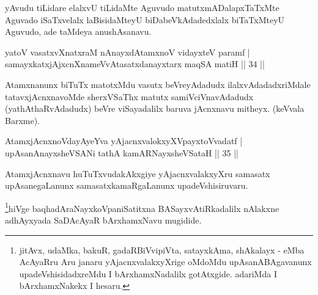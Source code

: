 \begin{artha}
yAvudu tiLidare elalxvU tiLidaMte Aguvudo matutx\break mADalapxTaTxMte Aguvado iSaTxvelalx laBisidaMteyU biDabeVkAdadedxlalx biTaTxMteyU Aguvudo, ade taMdeya anushAsanavu.
\end{artha}


\begin{shl}
yatoV vasatxvXnatxraM nAnayxdAtamxnoV vidayxteV paramf |\\
samayxkatxjAjxcnXnameVvAtasatxdanayxtarx maqSA matiH \hfill || 34 || 
\end{shl}

\begin{artha}
Atamxnanunx biTuTx matotxMdu vasutx beVreyAdadudx ilalxvAdadadx\-riMdale tatavxjAcnxnavoMde sherxVSaThx matutx samiVciVnavAdadudx (yathAthaRvAdadudx) beVre viSayadalilx baruva jAcnxnavu mitheyx. (keVvala Barxme).
\end{artha}


\begin{shl}
AtamxjAcnxnoVdayAyeYva yAjacnxvalokxyXV\s payxtoV\s vadatf |\\
upAsanAnayxsheVSANi tathA kamARNayxsheVSataH \hfill || 35 || 
\end{shl}

\begin{artha}
AtamxjAcnxnavu huTuTxvudakAkxgiye yAjacnxvalakxyXru samasatx upAsanegaLanunx samasatxkamaRgaLanunx upadeVshisiruvaru.
\end{artha}

\begin{artha}
\footnote{jitAvx, udaMka, bakuR, gadaRBiVvipiVta, satayxkAma, shAkalayx - eMba AcAyaRru Aru janaru yAjacnxvalakxyXrige oMdoMdu upAsanABAgavanunx upadeVshisidadxreMdu I bArxhamxNadalilx gotAtxgide. adariMda I bArxhamxNakekx I hesaru.}hiVge baqhadAraNayxkoVpaniSatitxna BASayxvAtiRkadalilx nAlakxne adhAyxyada SaDAcAyaR bArxhamxNavu mugidide.
\end{artha}


